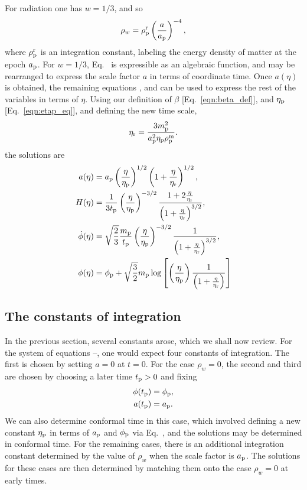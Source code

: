 For radiation one has $w=1/3$, and so
%
\begin{equation}
  \rho_w = \rho_{\mathrm{p}}^{\mathrm{r}}\left(\frac{a}{a_{\mathrm{p}}}\right)^{-4},
\end{equation}
%
where $\rho_{\mathrm{p}}^{\mathrm{r}}$ is an integration constant, labeling the energy density
of matter at the epoch $a_{\mathrm{p}}$.  For $w=1/3$, Eq.\ 
 is expressible as an algebraic function, and may
be rearranged to express the scale factor $a$ in terms of coordinate
time. Once $a(\eta)$ is obtained, the remaining equations
,  and  can
be used to express the rest of the variables in terms of $\eta$. Using
our definition of $\beta$ [Eq.\ \ref{eqn:beta_def}], and $\eta_{\mathrm{p}}$
[Eq.\ \ref{eqn:etap_eq}], and defining the new time scale,
%
\begin{equation}
  \eta_{\mathrm{r}} = \frac{3m_{\mathrm{p}}^2}{a_{\mathrm{p}}^2\eta_{\mathrm{p}}\rho_{\mathrm{p}}^{\mathrm{m}}}.
  \label{eqn:etar}
\end{equation}
%
the solutions are
%
\begin{align}
  a(\eta)
  &=
  a_{\mathrm{p}}\left(\frac{\eta}{\eta_{\mathrm{p}}}\right)^{1/2}
  \left({1+\frac{\eta}{\eta_{\mathrm{r}}}}\right)^{1/2},
  \\
  H(\eta) 
  &= 
  \frac{1}{3t_{\mathrm{p}}}\left(\frac{\eta}{\eta_{\mathrm{p}}}\right)^{-3/2}
  \frac{1+ 2\frac{\eta}{\eta_{\mathrm{r}}}}
  {\left(1+ \frac{\eta}{\eta_{\mathrm{r}}}\right)^{3/2}},
  \\
  \dot{\phi}(\eta) 
  &=
  \sqrt{\frac{2}{3}}\frac{m_{\mathrm{p}}}{t_{\mathrm{p}}}
  \left(\frac{\eta}{\eta_{\mathrm{p}}}\right)^{-3/2}
  \frac{1}{\left(1+ \frac{\eta}{\eta_{\mathrm{r}}}\right)^{3/2}},
  \\ 
  \phi(\eta) 
  &=
  \phi_{\mathrm{p}}+\sqrt {\frac{3}{2}}m_{\mathrm{p}}\log  
  \left[
  \left(\frac{\eta}{\eta_{\mathrm{p}}}\right)
  \frac {1}{\left(1+ \frac{\eta}{\eta_{\mathrm{r}}}\right)} 
  \right] 
\end{align}
%

\subsection{The constants of integration}
\label{sec:constants}
In the previous section, several constants arose, which we shall now
review. For the system of equations \eref{eqn:Ray_KD_eq_rho}
--, one would expect four constants of
integration. The first is chosen by setting $a=0$ at $t=0$. For the
case $\rho_w=0$, the second and third are chosen by choosing a later
time $t_{\mathrm{p}}>0$ and fixing
%
\begin{align}
  \phi(t_{\mathrm{p}}) &= \phi_{\mathrm{p}}, \nonumber\\
  a(t_{\mathrm{p}}) &= a_{\mathrm{p}}. \nonumber
\end{align}
%
We can also determine conformal time in this case, which involved
defining a new constant $\eta_{\mathrm{p}}$ in terms of $a_{\mathrm{p}}$ and $\phi_{\mathrm{p}}$ via
Eq.\ \eref{eqn:etap_eq}, and the solutions may be determined in
conformal time. For the remaining cases, there is an additional
integration constant determined by the value of $\rho_w$ when the
scale factor is $a_{\mathrm{p}}$. The solutions for these cases are then
determined by matching them onto the case $\rho_w=0$ at early times.

